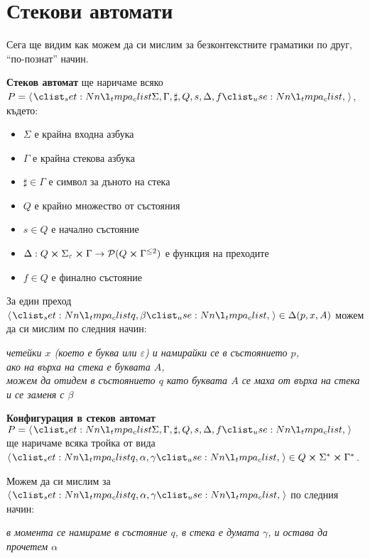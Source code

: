 \section{Стекови автомати}

Сега ще видим как можем да си мислим за безконтекстните граматики по друг, ``по-познат'' начин.

\begin{definition}
    \textbf{Стеков автомат} ще наричаме всяко $P = \opair{\Sigma, \Gamma, \sharp, Q, s, \Delta, f}$, където:

    \begin{itemize}
        \item $\Sigma$ е крайна входна азбука
        \item $\Gamma$ е крайна стекова азбука
        \item $\sharp \in \Gamma$ е символ за дъното на стека
        \item $Q$ е крайно множество от състояния
        \item $s \in Q$ е начално състояние
        \item $\Delta : Q \cross \Sigma_{\varepsilon} \cross \Gamma \rightarrow \mathcal{P}(Q \cross \Gamma^{\leq 2})$ е функция на преходите
        \item $f \in Q$ е финално състояние
    \end{itemize}
\end{definition}

За един преход $\opair{q, \beta} \in \Delta(p, x, A)$ можем да си мислим по следния начин:
\begin{center}
    \textit{четейки $x$ (което е буква или $\varepsilon$) и намирайки се в състоянието $p$, \\ ако на върха на стека е буквата $A$, \\ можем да отидем в състоянието $q$ като буквата $A$ се маха от върха на стека и се заменя с $\beta$}
\end{center}

\begin{definition}
    \textbf{Конфигурация в стеков автомат $P = \opair{\Sigma, \Gamma, \sharp, Q, s, \Delta, f}$} ще наричаме всяка тройка от вида $\opair{q, \alpha, \gamma} \in Q \cross \Sigma^* \cross \Gamma^*$.
\end{definition}

Можем да си мислим за $\opair{q, \alpha, \gamma}$ по следния начин:

\begin{center}
    \textit{в момента се намираме в състояние $q$, в стека е думата $\gamma$, и остава да прочетем $\alpha$}
\end{center}

